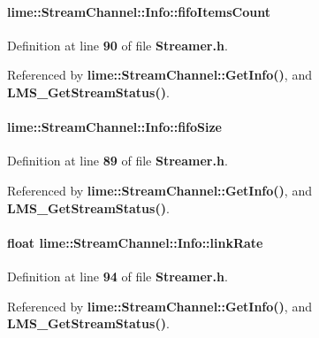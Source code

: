 \paragraph[{fifo\+Items\+Count}]{ lime\+::\+Stream\+Channel\+::\+Info\+::fifo\+Items\+Count}\label{structlime_1_1StreamChannel_1_1Info_a4e56b2f6c66478c7c5103e73bdbf2b4c}


Definition at line {\bf 90} of file {\bf Streamer.\+h}.



Referenced by {\bf lime\+::\+Stream\+Channel\+::\+Get\+Info()}, and {\bf L\+M\+S\+\_\+\+Get\+Stream\+Status()}.

\paragraph[{fifo\+Size}]{ lime\+::\+Stream\+Channel\+::\+Info\+::fifo\+Size}\label{structlime_1_1StreamChannel_1_1Info_abd630cc356ed78add2a71534a6990144}


Definition at line {\bf 89} of file {\bf Streamer.\+h}.



Referenced by {\bf lime\+::\+Stream\+Channel\+::\+Get\+Info()}, and {\bf L\+M\+S\+\_\+\+Get\+Stream\+Status()}.

\paragraph[{link\+Rate}]{\setlength{\rightskip}{0pt plus 5cm}float lime\+::\+Stream\+Channel\+::\+Info\+::link\+Rate}\label{structlime_1_1StreamChannel_1_1Info_a8ca091df521a71c4c275cb33c33894c9}


Definition at line {\bf 94} of file {\bf Streamer.\+h}.



Referenced by {\bf lime\+::\+Stream\+Channel\+::\+Get\+Info()}, and {\bf L\+M\+S\+\_\+\+Get\+Stream\+Status()}.


